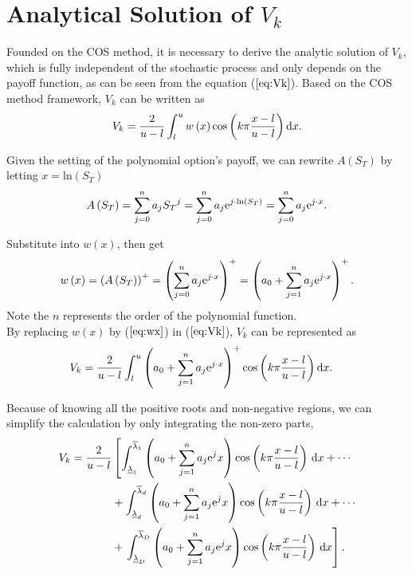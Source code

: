 \section{Analytical Solution of $V_k$}
Founded on the COS method, it is necessary to derive the analytic solution of $V_k$, which is fully independent of the stochastic process and only depends on the payoff function, as can be seen from the equation ($\ref{eq:Vk}$). Based on the COS method framework, $V_k$ can be written as
\begin{align}
    V_k =\frac {2}{u-l} \int_l ^u w \left( x \right) \cos \left( k \pi \frac{x-l}{u-l} \right) {\rm d}x. \label{eq:Vk}
\end{align}

Given the setting of the polynomial option's payoff, we can rewrite $A\left(S_T\right)$ by letting $x=\mathrm{ln}\left(S_T\right)$
\begin{align*}
    A\left(S_T\right)=\sum_{j=0}^{n}a_j {S_T}^{j} =\sum_{j=0}^{n}a_j{\rm e}^{j \cdot \mathrm{ln}\left(S_T\right)} =\sum_{j=0}^{n}a_j{\rm e}^{j \cdot x}.
\end{align*}

Substitute into $w(x)$, then get
\begin{align}
    w\left(x\right) = \left(A\left(S_T\right)\right)^{+}=\left(\sum_{j=0}^{n}a_j{\rm e}^{j \cdot x} \right)^{+}=\left(a_0+\sum_{j=1}^{n}a_j{\rm e}^{j \cdot x} \right)^{+}. \label{eq:wx}
\end{align}
Note the $n$ represents the order of the polynomial function. \\

By replacing $w\left(x\right)$ by ($\ref{eq:wx}$) in ($\ref{eq:Vk}$), $V_k$ can be represented as
\begin{align*} 
    V_k &= \frac {2}{u-l} \int_l ^u \left(a_0+\sum_{j=1}^{n}a_j{\rm e}^{j \cdot x} \right)^{+} \cos \left( k \pi \frac{x-l}{u-l} \right) {\rm d}x.
\end{align*}

Because of knowing all the positive roots and non-negative regions, we can simplify the calculation by only integrating the non-zero parts,
\begin{align*}
    V_k =  \frac {2}{u-l}&\left[\int_{\underline{\lambda}_1}^{\overline{\lambda}_1}\left(a_0+\sum_{j=1}^na_j{\rm e}^jx\right)\cos \left(k\pi \frac{x-l}{u-l}\right)\,{\rm d}x +\cdots\right. \\
    & +\int_{\underline{\lambda}_d}^{\overline{\lambda}_d}\left(a_0+\sum_{j=1}^na_j{\rm e}^jx\right)\cos \left(k\pi \frac{x-l}{u-l}\right)\,{\rm d}x +\cdots                               \\
    & +\left. \int_{\underline{\lambda}_D}^{\overline{\lambda}_D}\left(a_0+\sum_{j=1}^na_j{\rm e}^jx\right)\cos \left(k\pi \frac{x-l}{u-l}\right)\,{\rm d}x\right].
\end{align*}

